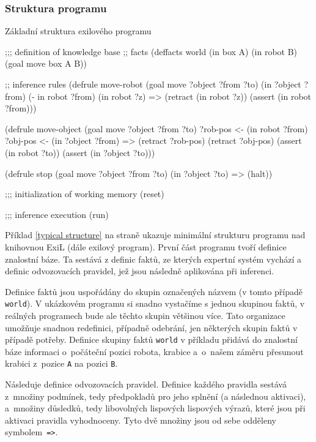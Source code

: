\subsubsection{Struktura programu}

\begin{listing}[h]
\caption{Základní struktura exilového programu}
\label{typical structure}
\begin{clcode}
;;; definition of knowledge base
;; facts
(deffacts world
  (in box A)
  (in robot B)
  (goal move box A B))

;; inference rules
(defrule move-robot
  (goal move ?object ?from ?to)
  (in ?object ?from)
  (- in robot ?from)
  (in robot ?z)
  =>
  (retract (in robot ?z))
  (assert (in robot ?from)))

(defrule move-object
  (goal move ?object ?from ?to)
  ?rob-pos <- (in robot ?from)
  ?obj-pos <- (in ?object ?from)
  =>
  (retract ?rob-pos)
  (retract ?obj-pos)
  (assert (in robot ?to))
  (assert (in ?object ?to)))

(defrule stop
  (goal move ?object ?from ?to)
  (in ?object ?to)
  =>
  (halt))

;;; initialization of working memory
(reset)

;;; inference execution
(run)
\end{clcode}
\end{listing}

Příklad \ref{typical structure} na straně \pageref{typical structure} ukazuje
minimální strukturu programu nad knihovnou ExiL (dále exilový program). První
část programu tvoří definice znalostní báze. Ta sestává z definic faktů, ze
kterých expertní systém vychází a definic odvozovacích pravidel, jež jsou
následně aplikována při inferenci.

Definice faktů jsou uspořádány do skupin označených názvem (v tomto případě
\verb|world|). V ukázkovém programu si snadno vystačíme s jednou skupinou faktů,
v reálných programech bude ale těchto skupin většinou více. Tato organizace
umožňuje snadnou redefinici, případně odebrání, jen některých skupin faktů v
případě potřeby.  Definice skupiny faktů \verb|world| v příkladu přidává do
znalostní báze informaci o~počáteční pozici robota, krabice a~o~našem záměru
přesunout krabici z~pozice \verb|A| na pozici \verb|B|.

Následuje definice odvozovacích pravidel. Definice každého pravidla sestává
z~množiny podmínek, tedy předpokladů pro jeho splnění (a následnou aktivaci),
a~množiny důsledků, tedy libovolných lispových lispových výrazů, které jsou při
aktivaci pravidla vyhodnoceny.  Tyto dvě množiny jsou od sebe odděleny
symbolem~\verb|=>|.

